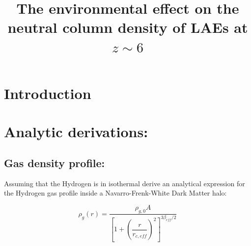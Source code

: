 \documentclass[a4,useAMS,usenatbib,usegraphicx]{mn2e}
\begin{document}
\title[]{The environmental effect on the neutral column density of
LAEs at $z\sim 6$}

\maketitle

\begin{abstract}
\end{abstract}

\begin{keywords}
\end{keywords}


\section{Introduction}
\label{sec:introduction}



\section{Analytic derivations:}
\subsection{Gas density profile:}\label{sec:rho}

Assuming that the Hydrogen is in isothermal \citep{Makino98} derive an 
analytical expression for the Hydrogen gas profile inside a
Navarro-Frenk-White Dark Matter halo:

\begin{equation}\label{eq:rhogr}
\rho_g(r) =  \dfrac{\rho_{g,0}A}{\left[ 1 + \left(\dfrac{r}{r_{c,eff}}\right)^2 \right]^{3\beta_{eff}/2}}
\end{equation}
\end{document}
